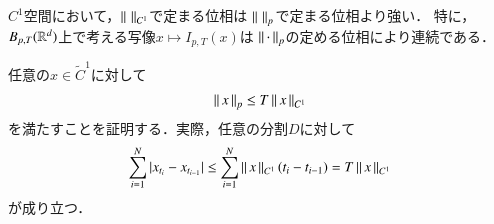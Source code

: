\begin{screen}
	\begin{thm}
		$C^1$空間において，$\left\|\, \, \right\|_{C^1}$で定まる位相は
		$\left\|\, \, \right\|_{p}$で定まる位相より強い．
		特に，$B_{p,T}(\mathbb{R}^d)$上で考える写像$x \longmapsto I_{p,T}(x)$は
		$\left\|\, \cdot\, \right\|_{p}$の定める位相により連続である．
	\end{thm}
\end{screen}

\begin{prf}
	任意の$x \in \tilde{C}^1$に対して
	\begin{align}
		\left\|\, x\, \right\|_{p} \leq T \left\|\, x\, \right\|_{C^1}
	\end{align}
	を満たすことを証明する．実際，任意の分割$D$に対して
	\begin{align}
		\sum_{i=1}^{N} |x_{t_i} - x_{t_{i-1}}|
		\leq \sum_{i=1}^{N} \left\|\, x\, \right\|_{C^1} (t_i - t_{i-1})
		= T \left\|\, x\, \right\|_{C^1}
	\end{align}
	が成り立つ．
	\QED
\end{prf}